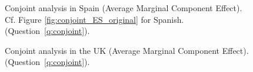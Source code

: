 \begin{figure}[h!]
    \caption[Conjoint analysis in Spain]{Conjoint analysis in Spain (Average Marginal Component Effect). Cf. Figure \ref{fig:conjoint_ES_original} for Spanish. \hfill (Question~\ref{q:conjoint}).
    }\label{fig:conjoint_ES}
\end{figure}

\begin{figure}[h!]
    \caption[Conjoint analysis in the UK]{Conjoint analysis in the UK (Average Marginal Component Effect). \hfill (Question~\ref{q:conjoint}).
    }\label{fig:conjoint_GB}
\end{figure}

